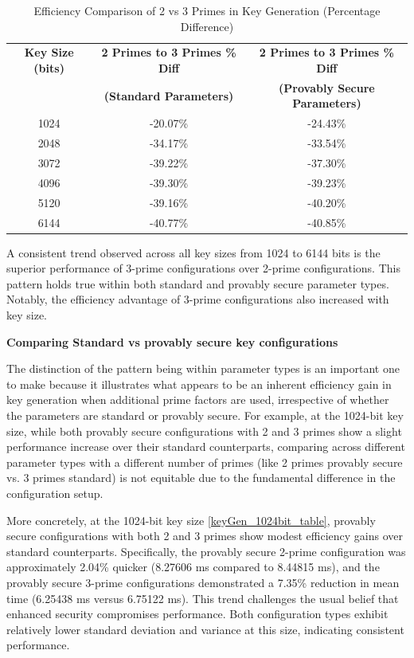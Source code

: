 \documentclass[]{final_report}
\theoremstyle{definition}
\begin{document}
\begin{table}[H]
\centering
\caption{Efficiency Comparison of 2 vs 3 Primes in Key Generation (Percentage Difference)}
\begin{tabular}{|c|c|c|}
\hline
\textbf{Key Size (bits)} & \textbf{2 Primes to 3 Primes \% Diff} & \textbf{2 Primes to 3 Primes \% Diff} \\
 & \textbf{(Standard Parameters)} & \textbf{(Provably Secure Parameters)} \\
\hline
1024 & -20.07\% & -24.43\% \\
2048 & -34.17\% & -33.54\% \\
3072 & -39.22\% & -37.30\% \\
4096 & -39.30\% & -39.23\% \\
5120 & -39.16\% & -40.20\% \\
6144 & -40.77\% & -40.85\% \\
\hline
\end{tabular}
\label{tab:2vs3primes_percentage}
\end{table}

A consistent trend observed across all key sizes from 1024 to 6144 bits is the superior performance of 3-prime configurations over 2-prime configurations. This pattern holds true within both standard and provably secure parameter types. Notably, the efficiency advantage of 3-prime configurations also increased with key size.


\textbf{Comparing Standard vs provably secure key configurations}

The distinction of the pattern being within parameter types is an important one to make because it illustrates what appears to be an inherent efficiency gain in key generation when additional prime factors are used, irrespective of whether the parameters are standard or provably secure. For example, at the 1024-bit key size, while both provably secure configurations with 2 and 3 primes show a slight performance increase over their standard counterparts, comparing across different parameter types with a different number of primes (like 2 primes provably secure vs. 3 primes standard) is not equitable due to the fundamental difference in the configuration setup.

More concretely, at the 1024-bit key size \ref{keyGen_1024bit_table}, provably secure configurations with both 2 and 3 primes show modest efficiency gains over standard counterparts. Specifically, the provably secure 2-prime configuration was approximately 2.04\% quicker (8.27606 ms compared to 8.44815 ms), and the provably secure 3-prime configurations demonstrated a 7.35\% reduction in mean time (6.25438 ms versus 6.75122 ms). This trend challenges the usual belief that enhanced security compromises performance. Both configuration types exhibit relatively lower standard deviation and variance at this size, indicating consistent performance.
\end{document}

